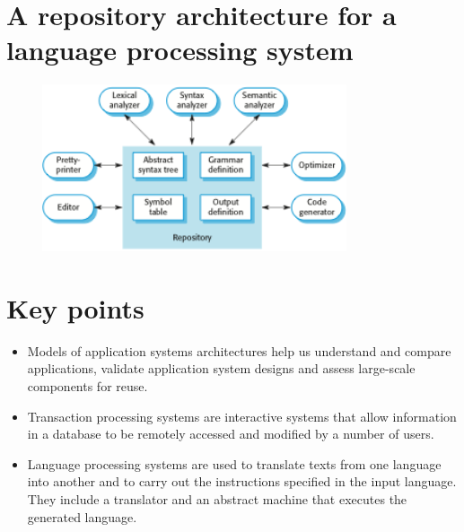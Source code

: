 \section{A repository architecture for a language processing system}
\begin{figure}[h!]
    \centering
    \includegraphics[width = 0.8\textwidth]{./figures/L3_15.png}
    \caption{}
    \label{fig:L3_15}
\end{figure}


\section{Key points}
\begin{itemize}
\item Models of application systems architectures help us understand and compare applications, validate application system designs and assess large-scale components for reuse.

\item Transaction processing systems are interactive systems that allow information in a database to be remotely accessed and modified by a number of users.

\item Language processing systems are used to translate texts from one language into another and to carry out the instructions specified in the input language. They include a translator and an abstract machine that executes the generated language.
\end{itemize}
